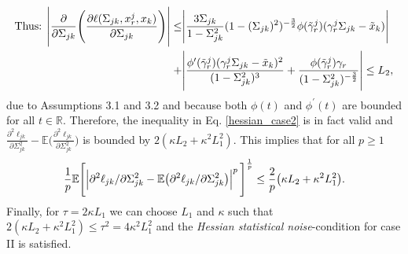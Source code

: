 \begin{condition}
\begin{multline}
\begin{aligned}
            \end{aligned}
    \end{multline} 
    \begin{equation*}
        \begin{split}
            \text{Thus: } \abs{\frac{\partial}{\partial \Sigma_{jk}} \Bigg(\frac{\partial\ell(\Sigma_{jk}, x^j_r,x_k)}{\partial \Sigma_{jk}}\Bigg)} \leq &\abs{\frac{3\Sigma_{jk}}{1-\Sigma_{jk}^2} (1-(\Sigma_{jk})^2)^{-\frac{3}{2}} \phi({\Tilde{\gamma}}^j_{r})({\gamma}^j_r\Sigma_{jk} - {\Tilde{x}}_{k})} \\
            + &\abs{\frac{\phi^\prime({\Tilde{\gamma}}^j_{r})({\gamma}^j_r\Sigma_{jk} - {\Tilde{x}}_{k})^2}{(1-\Sigma_{jk}^2)^3} + \frac{\phi({\Tilde{\gamma}}^j_{r}){\gamma}_{r}}{(1-\Sigma_{jk}^2)^{-\frac{3}{2}}}} \leq L_2,
        \end{split} 
    \end{equation*}
    due to Assumptions 3.1 and 3.2 %
    and because both $\phi(t)$ and $\phi^{\prime}(t)$ are bounded for all $t\in\mathbb{R}$. Therefore, the inequality in Eq. \eqref{hessian_case2} is in fact valid and $\frac{\partial^2\ell_{jk}}{\partial \Sigma_{jk}^{2}} - \mathbb{E}\bigg(\frac{\partial^2\ell_{jk}}{\partial \Sigma_{jk}^{2}}\bigg)$ is bounded by $2(\kappa L_2 + \kappa^2 L_1^2)$. This implies that for all $p\geq1$
    \begin{equation}
         \frac{1}{p}\mathbb{E}\Bigg[\abs{\partial^2\ell_{jk}/\partial \Sigma_{jk}^{2} - \mathbb{E}\big(\partial^2\ell_{jk}/\partial \Sigma_{jk}^{2}\big)}^p\Bigg]^{\frac{1}{p}} \leq \frac{2}{p}\big(\kappa L_2 + \kappa^2 L_1^2\big).
    \end{equation}
    Finally, for $\tau = 2\kappa L_1$ we can choose $L_1$ and $\kappa$ such that $2(\kappa L_2 + \kappa^2 L_1^2) \leq \tau^2 = 4\kappa^2 L_1^2$ and the \textit{Hessian statistical noise}-condition for case II is satisfied. 
    

\end{condition}
